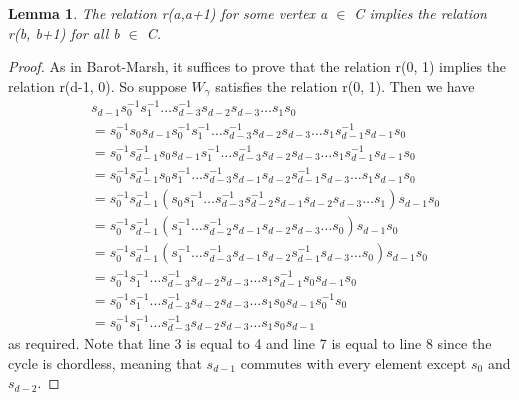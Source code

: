 \documentclass[11pt]{amsart}
\newtheorem{lem}[thm]{Lemma}
\theoremstyle{definition}
\begin{document}
\begin{lem}
The relation r(a,a+1) for some vertex a $\in$ C implies the relation r(b, b+1) for all b $\in$ C.
\end{lem}
\begin{proof}
As in Barot-Marsh, it suffices to prove that the relation r(0, 1) implies the relation r(d-1, 0). So suppose $W_{\gamma}$ satisfies the relation r(0, 1). Then we have 
\begin{align*}
& s_{d-1}s_{0}^{-1}s_{1}^{-1}\dots s_{d-3}^{-1}s_{d-2}s_{d-3}\dots s_1s_0 \\
&= s_{0}^{-1}s_{0}s_{d-1}s_{0}^{-1}s_{1}^{-1}\dots s_{d-3}^{-1}s_{d-2}s_{d-3}\dots s_{1}s_{d-1}^{-1}s_{d-1}s_{0} \\
&= s_{0}^{-1}s_{d-1}^{-1}s_{0}s_{d-1}s_{1}^{-1}\dots s_{d-3}^{-1}s_{d-2}s_{d-3}\dots s_{1}s_{d-1}^{-1}s_{d-1}s_{0} \\
&= s_{0}^{-1}s_{d-1}^{-1}s_{0}s_{1}^{-1}\dots s_{d-3}^{-1}s_{d-1}s_{d-2}s_{d-1}^{-1}s_{d-3}\dots s_{1}s_{d-1}s_{0} \\
&= s_{0}^{-1}s_{d-1}^{-1}(s_{0}s_{1}^{-1}\dots s_{d-3}^{-1}s_{d-2}^{-1}s_{d-1}s_{d-2}s_{d-3}\dots s_{1})s_{d-1}s_{0} \\
&= s_{0}^{-1}s_{d-1}^{-1}(s_{1}^{-1} \dots s_{d-2}^{-1}s_{d-1}s_{d-2}s_{d-3}\dots s_{0})s_{d-1}s_{0} \\
&= s_{0}^{-1}s_{d-1}^{-1}(s_{1}^{-1} \dots s_{d-3}^{-1}s_{d-1}s_{d-2}s_{d-1}^{-1}s_{d-3}\dots s_{0})s_{d-1}s_{0} \\
&= s_{0}^{-1}s_{1}^{-1}\dots s_{d-3}^{-1}s_{d-2}s_{d-3}\dots s_{1}s_{d-1}^{-1}s_{0}s_{d-1}s_{0} \\
&= s_{0}^{-1}s_{1}^{-1}\dots s_{d-3}^{-1}s_{d-2}s_{d-3}\dots s_{1}s_{0}s_{d-1}s_{0}^{-1}s_{0} \\
&= s_{0}^{-1}s_{1}^{-1}\dots s_{d-3}^{-1}s_{d-2}s_{d-3}\dots s_{1}s_{0}s_{d-1} 
\end{align*}
as required. Note that line 3 is equal to 4 and line 7 is equal to line 8 since the cycle is chordless, meaning that $s_{d-1}$ commutes with every element except $s_{0}$ and $s_{d-2}$.
\end{proof}
\end{document}
